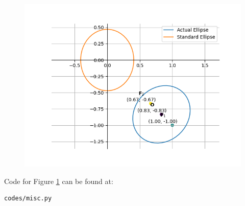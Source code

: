 \documentclass[journal]{IEEEtran}
\begin{document}
\begin{figure}[H]
	\centering
	\includegraphics[width=0.75\columnwidth]{Figures/fig1.png} 
	\caption{}
	\label{fig1}
\end{figure} 

Code for Figure \ref{fig1} can be found at:
\begin{lstlisting}
codes/misc.py
\end{lstlisting}
\end{document}
